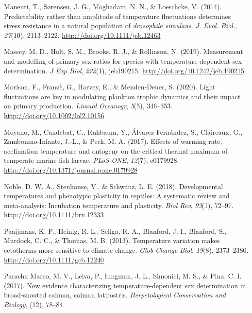 \documentclass[12pt,twoside]{reedthesis}
\begin{document}
\leavevmode\hypertarget{ref-manenti_predictability_2014-2}{}%
Manenti, T., Sørensen, J. G., Moghadam, N. N., \& Loeschcke, V. (2014). Predictability rather than amplitude of temperature fluctuations determines stress resistance in a natural population of \emph{drosophila simulans}. \emph{J. Evol. Biol.}, \emph{27}(10), 2113--2122. \url{http://doi.org/10.1111/jeb.12463}

\leavevmode\hypertarget{ref-massey_measurement_2019}{}%
Massey, M. D., Holt, S. M., Brooks, R. J., \& Rollinson, N. (2019). Measurement and modelling of primary sex ratios for species with temperature-dependent sex determination. \emph{J Exp Biol}, \emph{222}(1), jeb190215. \url{http://doi.org/10.1242/jeb.190215}

\leavevmode\hypertarget{ref-morison_light_2020}{}%
Morison, F., Franzè, G., Harvey, E., \& Menden‐Deuer, S. (2020). Light fluctuations are key in modulating plankton trophic dynamics and their impact on primary production. \emph{Limnol Oceanogr}, \emph{5}(5), 346--353. \url{http://doi.org/10.1002/lol2.10156}

\leavevmode\hypertarget{ref-moyano_effects_2017}{}%
Moyano, M., Candebat, C., Ruhbaum, Y., Álvarez-Fernández, S., Claireaux, G., Zambonino-Infante, J.-L., \& Peck, M. A. (2017). Effects of warming rate, acclimation temperature and ontogeny on the critical thermal maximum of temperate marine fish larvae. \emph{PLoS ONE}, \emph{12}(7), e0179928. \url{http://doi.org/10.1371/journal.pone.0179928}

\leavevmode\hypertarget{ref-noble_developmental_2018}{}%
Noble, D. W. A., Stenhouse, V., \& Schwanz, L. E. (2018). Developmental temperatures and phenotypic plasticity in reptiles: A systematic review and meta-analysis: Incubation temperature and plasticity. \emph{Biol Rev}, \emph{93}(1), 72--97. \url{http://doi.org/10.1111/brv.12333}

\leavevmode\hypertarget{ref-paaijmans_temperature_2013}{}%
Paaijmans, K. P., Heinig, R. L., Seliga, R. A., Blanford, J. I., Blanford, S., Murdock, C. C., \& Thomas, M. B. (2013). Temperature variation makes ectotherms more sensitive to climate change. \emph{Glob Change Biol}, \emph{19}(8), 2373--2380. \url{http://doi.org/10.1111/gcb.12240}

\leavevmode\hypertarget{ref-parachu_marco_new_2017}{}%
Parachu Marco, M. V., Leiva, P., Iungman, J. L., Simonici, M. S., \& Pina, C. I. (2017). New evidence characterizing temperature-dependent sex determination in broad-snouted caiman, caiman latirostris. \emph{Herpetological Conservation and Biology}, (12), 78--84.
\end{document}
